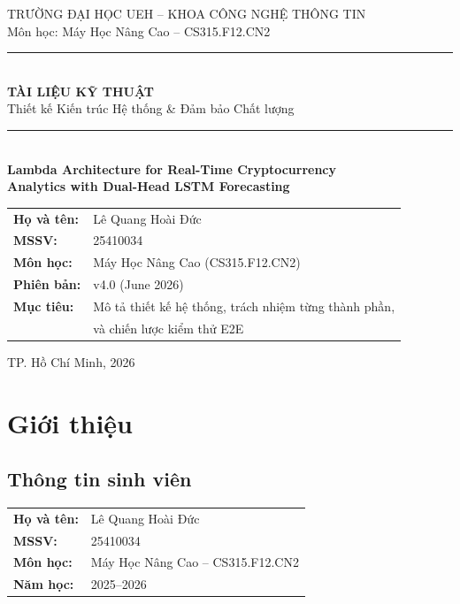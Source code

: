 \documentclass[12pt, a4paper]{article}
\begin{document}
\begin{titlepage}
\centering
\vspace*{1.5cm}
{\large TRƯỜNG ĐẠI HỌC UEH -- KHOA CÔNG NGHỆ THÔNG TIN}\\[0.4cm]
{\large Môn học: Máy Học Nâng Cao -- CS315.F12.CN2}\\[1.2cm]
\rule{\linewidth}{1pt}\\[0.5cm]
{\LARGE \bfseries TÀI LIỆU KỸ THUẬT}\\[0.4cm]
{\Large Thiết kế Kiến trúc Hệ thống \& Đảm bảo Chất lượng}\\[0.3cm]
\rule{\linewidth}{1pt}\\[1cm]
{\large \bfseries Lambda Architecture for Real-Time Cryptocurrency\\
Analytics with Dual-Head LSTM Forecasting}\\[2cm]
\begin{tabular}{ll}
  \textbf{Họ và tên:}   & Lê Quang Hoài Đức \\[0.4em]
  \textbf{MSSV:}        & 25410034 \\[0.4em]
  \textbf{Môn học:}     & Máy Học Nâng Cao (CS315.F12.CN2) \\[0.4em]
  \textbf{Phiên bản:}   & v4.0 (June 2026) \\[0.4em]
  \textbf{Mục tiêu:}    & Mô tả thiết kế hệ thống, trách nhiệm từng thành phần, \\
                        & và chiến lược kiểm thử E2E \\
\end{tabular}
\vfill
{\normalsize TP. Hồ Chí Minh, 2026}
\end{titlepage}

\tableofcontents
\newpage

\section{Giới thiệu}

\subsection{Thông tin sinh viên}

\begin{tabular}{ll}
  \textbf{Họ và tên:} & Lê Quang Hoài Đức \\[0.3em]
  \textbf{MSSV:}      & 25410034 \\[0.3em]
  \textbf{Môn học:}   & Máy Học Nâng Cao -- CS315.F12.CN2 \\[0.3em]
  \textbf{Năm học:}   & 2025--2026 \\
\end{tabular}
\end{document}
